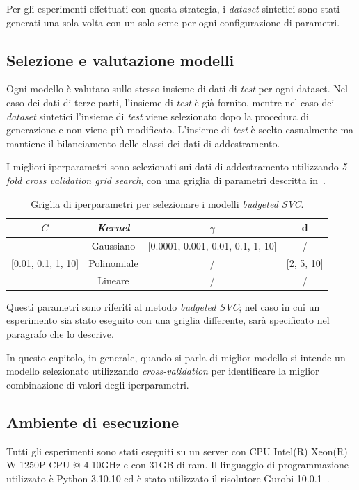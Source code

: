 Per gli esperimenti effettuati con questa strategia, i \emph{dataset} sintetici sono stati generati una sola volta con un solo seme per ogni configurazione di parametri.

\subsection{Selezione e valutazione modelli}
Ogni modello è valutato sullo stesso insieme di dati di \emph{test} per ogni dataset.
Nel caso dei dati di terze parti, l'insieme di \emph{test} è già fornito, mentre nel caso dei \emph{dataset} sintetici l'insieme di \emph{test} viene selezionato dopo la procedura di generazione e non viene più modificato.
L'insieme di \emph{test} è scelto casualmente ma mantiene il bilanciamento delle classi dei dati di addestramento.

I migliori iperparametri sono selezionati sui dati di addestramento utilizzando \emph{5-fold cross validation grid search}, con una griglia di parametri descritta in~.
\begin{table}
    \centering
    \begin{tabular}{cccc}
        \toprule
        $C$ & \emph{Kernel} & $\gamma$ & d \\
        \midrule
        \multirow{3}{*}{[0.01, 0.1, 1, 10]} & Gaussiano   & [0.0001, 0.001, 0.01, 0.1, 1, 10]   & /\\
                                            \cline{2-4}
                                            & Polinomiale   & / & [2, 5, 10] \\
                                            \cline{2-4}
                                            & Lineare       & / & / \\
        \bottomrule
    \end{tabular}
    \caption{Griglia di iperparametri per selezionare i modelli \emph{budgeted SVC}.}
    \label{tab:gridsearch_2d}
\end{table}
Questi parametri sono riferiti al metodo \emph{budgeted SVC}; nel caso in cui un esperimento sia stato eseguito con una griglia differente, sarà specificato nel paragrafo che lo descrive.

In questo capitolo, in generale, quando si parla di miglior modello si intende un modello selezionato utilizzando \emph{cross-validation} per identificare la miglior combinazione di valori degli iperparametri.

\subsection{Ambiente di esecuzione}
Tutti gli esperimenti sono stati eseguiti su un server con CPU Intel(R) Xeon(R) W-1250P CPU @ 4.10GHz e con 31GB di ram. Il linguaggio di programmazione utilizzato è Python 3.10.10 ed è stato utilizzato il risolutore Gurobi 10.0.1~\cite{gurobi}. 

